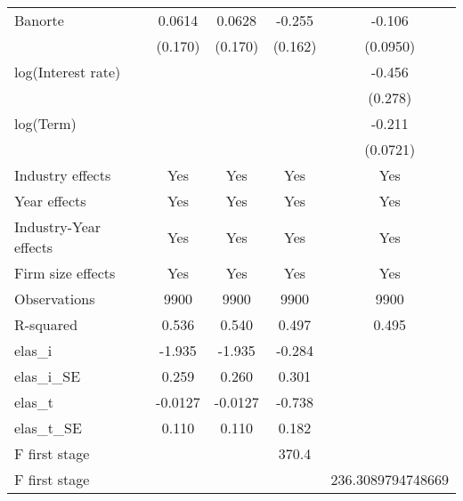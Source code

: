 {\begin{tabular}{l*{4}{c}}
Banorte         &   0.0614         &   0.0628         &   -0.255         &   -0.106         \\
                &  (0.170)         &  (0.170)         &  (0.162)         & (0.0950)         \\
log(Interest rate)&                  &                  &                  &   -0.456         \\
                &                  &                  &                  &  (0.278)         \\
log(Term)       &                  &                  &                  &   -0.211\sym{***}\\
                &                  &                  &                  & (0.0721)         \\
Industry effects &      Yes         &      Yes         &      Yes         &      Yes         \\
Year effects    &      Yes         &      Yes         &      Yes         &      Yes         \\
Industry-Year effects &      Yes         &      Yes         &      Yes         &      Yes         \\
Firm size effects &      Yes         &      Yes         &      Yes         &      Yes         \\
\hline
Observations    &     9900         &     9900         &     9900         &     9900         \\
R-squared       &    0.536         &    0.540         &    0.497         &    0.495         \\
elas_i          &   -1.935         &   -1.935         &   -0.284         &                  \\
elas_i_SE       &    0.259         &    0.260         &    0.301         &                  \\
elas_t          &  -0.0127         &  -0.0127         &   -0.738         &                  \\
elas_t_SE       &    0.110         &    0.110         &    0.182         &                  \\
F first stage   &                  &                  &    370.4         &                  \\
F first stage   &                  &                  &                  &236.3089794748669         \\
\hline\hline
\end{tabular}
}
